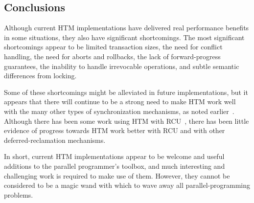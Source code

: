 \fi

\subsection{Conclusions}
\label{sec:future:Conclusions}

Although current HTM implementations have delivered real performance
benefits in some situations, they also have significant shortcomings.
The most significant shortcomings appear to be
limited transaction sizes,
the need for conflict handling, the need for aborts and rollbacks,
the lack of forward-progress guarantees,
the inability to handle irrevocable operations,
and subtle semantic differences
from locking.

Some of these shortcomings might be alleviated in future implementations,
but it appears that there will continue to be a strong need to make
HTM work well with the many other types of synchronization mechanisms,
as noted earlier~\cite{McKenney2007PLOSTM,PaulEMcKenney2010OSRGrassGreener}.
Although there has been some work using HTM with
RCU~\cite{Siakavaras2017CombiningHA,DimitriosSiakavaras2020RCU-HTM-B+Trees,ChristinaGiannoula2018HTM-RCU-graphcoloring,SeongJaePark2020HTMRCUlock},
there has been little evidence of progress towards HTM work better with
RCU and with other deferred-reclamation mechanisms.

In short, current HTM implementations appear to be welcome and useful
additions to the parallel programmer's toolbox, and much interesting
and challenging work is required to make use of them.
However, they cannot be
considered to be a magic wand with which to wave away all parallel-programming
problems.
